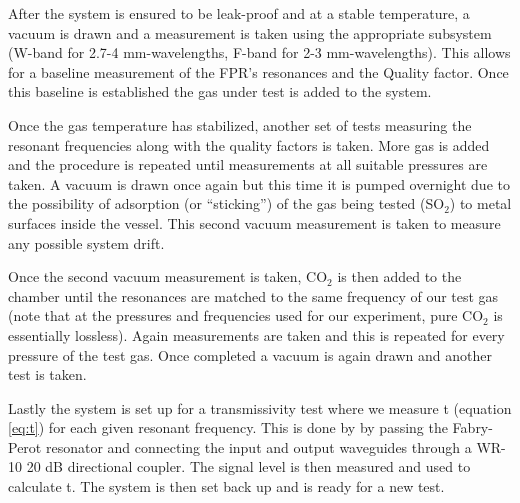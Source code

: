 After the system is ensured to be leak-proof and at a stable temperature, a vacuum is drawn and a measurement is taken using the appropriate subsystem (W-band for 2.7-4 mm-wavelengths, F-band for 2-3 mm-wavelengths). This allows for a baseline measurement of the FPR's resonances and the Quality factor. Once this baseline is established the gas under test is added to the system.

Once the gas temperature has stabilized, another set of tests measuring the resonant frequencies along with the quality factors is taken. More gas is added and the procedure is repeated until measurements at all suitable pressures are taken. A vacuum is drawn once again but this time it is pumped overnight due to the possibility of adsorption (or ``sticking'') of the gas being tested (SO$_2$) to metal surfaces inside the vessel. This second vacuum measurement is taken to measure any possible system drift.

Once the second vacuum measurement is taken, CO$_2$ is then added to the chamber until the resonances are matched to the same frequency of our test gas (note that at the pressures and frequencies used for our experiment, pure CO$_2$ is essentially lossless). Again measurements are taken and this is repeated for every pressure of the test gas. Once completed a vacuum is again drawn and another test is taken. 

Lastly the system is set up for a transmissivity test where we measure t (equation \ref{eq:t}) for each given resonant frequency. This is done by by passing the Fabry-Perot resonator and connecting the input and output waveguides through a WR-10 20 dB directional coupler. The signal level is then measured and used to calculate t.  The system is then set back up and is ready for a new test. %


